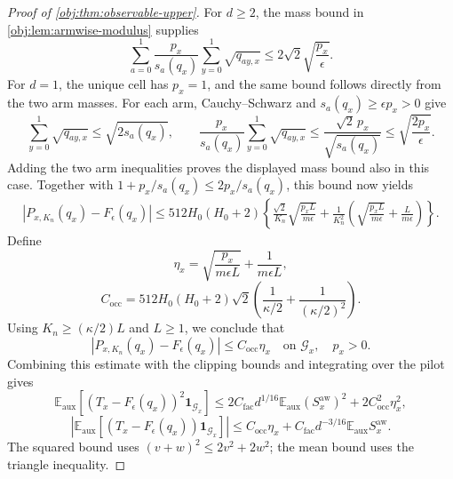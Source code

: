 \begin{proof}[Proof of \cref{obj:thm:observable-upper}]
For \(d\ge2\), the mass bound in \cref{obj:lem:armwise-modulus} supplies
\[
\sum_{a=0}^1\frac{p_x}{s_a(q_x)}
\sum_{y=0}^1\sqrt{q_{ay,x}}
\le2\sqrt2\sqrt{\frac{p_x}{\epsilon}}.
\]
For \(d=1\), the unique cell has \(p_x=1\), and the same bound follows directly from the two arm masses. For each arm, Cauchy--Schwarz and \(s_a(q_x)\ge\epsilon p_x>0\) give
\[
\sum_{y=0}^1\sqrt{q_{ay,x}}\le\sqrt{2s_a(q_x)},
\qquad
\frac{p_x}{s_a(q_x)}\sum_{y=0}^1\sqrt{q_{ay,x}}
\le\frac{\sqrt2\,p_x}{\sqrt{s_a(q_x)}}
\le\sqrt{\frac{2p_x}{\epsilon}}.
\]
Adding the two arm inequalities proves the displayed mass bound also in this case.
Together with \(1+p_x/s_a(q_x)\le2p_x/s_a(q_x)\), this bound now yields
\[
\begin{aligned}
|P_{x,K_n}(q_x)-F_\epsilon(q_x)|
\le512H_0(H_0+2)
\left\{
\frac{\sqrt2}{K_n}\sqrt{\frac{p_xL}{m\epsilon}}
+
\frac1{K_n^2}
\left(\sqrt{\frac{p_xL}{m\epsilon}}+\frac L{m\epsilon}\right)
\right\}.
\end{aligned}
\]
Define
\[
\eta_x=
\sqrt{\frac{p_x}{m\epsilon L}}+\frac1{m\epsilon L},
\]
\[
C_{\mathrm{occ}}
=
512H_0(H_0+2)\sqrt2
\left(\frac1{\kappa/2}+\frac1{(\kappa/2)^2}\right).
\]
Using \(K_n\ge(\kappa/2)L\) and \(L\ge1\), we conclude that
\[
|P_{x,K_n}(q_x)-F_\epsilon(q_x)|
\le C_{\mathrm{occ}}\eta_x
\quad\text{on }\mathcal G_x,\quad p_x>0.
\]
Combining this estimate with the clipping bounds and integrating over the pilot gives
\[
\mathbb E_{\mathrm{aux}}
[(T_x-F_\epsilon(q_x))^2\mathbf1_{\mathcal G_x}]
\le
2C_{\mathrm{fac}}d^{1/16}
\mathbb E_{\mathrm{aux}}(S_x^{\mathrm{aw}})^2
+2C_{\mathrm{occ}}^2\eta_x^2,
\]
\[
\left|
\mathbb E_{\mathrm{aux}}
[(T_x-F_\epsilon(q_x))\mathbf1_{\mathcal G_x}]
\right|
\le
C_{\mathrm{occ}}\eta_x
+
C_{\mathrm{fac}}d^{-3/16}
\mathbb E_{\mathrm{aux}}S_x^{\mathrm{aw}}.
\]
The squared bound uses
\((v+w)^2\le2v^2+2w^2\); the mean bound uses the triangle inequality.


\end{proof}

